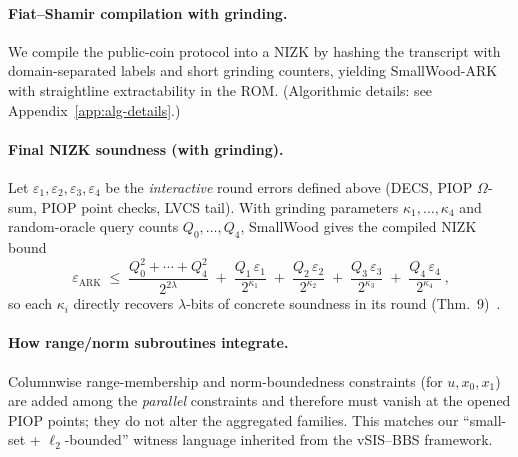 \paragraph{Fiat--Shamir compilation with grinding.}
We compile the public-coin protocol into a NIZK by hashing the transcript with domain-separated labels and short grinding counters, yielding SmallWood-ARK with straightline extractability in the ROM. (Algorithmic details: see Appendix~\ref{app:alg-details}.)

\paragraph{Final NIZK soundness (with grinding).}\label{sec:final-soundness}
Let $\varepsilon_1,\varepsilon_2,\varepsilon_3,\varepsilon_4$ be the \emph{interactive} round errors defined above (DECS, PIOP $\Omega$-sum, PIOP point checks, LVCS tail). With grinding parameters $\kappa_1,\dots,\kappa_4$ and random-oracle query counts $Q_0,\dots,Q_4$, SmallWood gives the compiled NIZK bound
\[
\boxed{\ \varepsilon_{\mathrm{ARK}} \;\le\; \frac{Q_0^2+\cdots+Q_4^2}{2^{2\lambda}}
\;+\; \frac{Q_1\,\varepsilon_1}{2^{\kappa_1}}
\;+\; \frac{Q_2\,\varepsilon_2}{2^{\kappa_2}}
\;+\; \frac{Q_3\,\varepsilon_3}{2^{\kappa_3}}
\;+\; \frac{Q_4\,\varepsilon_4}{2^{\kappa_4}} \ }\!,
\]
so each $\kappa_i$ directly recovers $\lambda$-bits of concrete soundness in its round (Thm.~9)~\cite{cryptoeprint:2025/1085}.



\begin{center}\end{center}

\paragraph{How range/norm subroutines integrate.}
Columnwise range-membership and norm-boundedness constraints (for $u,x_0,x_1$) are added among the \emph{parallel} constraints and therefore must vanish at the opened PIOP points; they do not alter the aggregated families. This matches our ``small-set + $\ell_2$-bounded'' witness language inherited from the vSIS--BBS framework.

